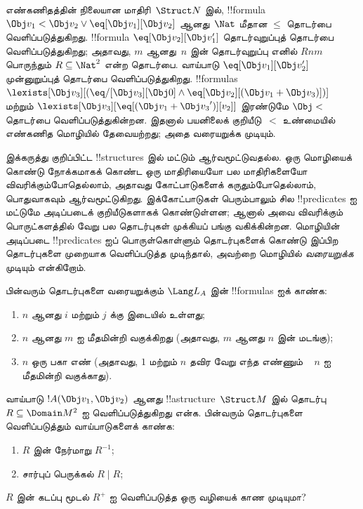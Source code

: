 \documentclass[../../../include/open-logic-section]{subfiles}
\begin{document}
\begin{ex}
எண்கணிதத்தின் நிலையான மாதிரி~$\Struct N$ இல், !!{formula}
$\Obj v_1 < \Obj v_2 \lor \eq[\Obj v_1][\Obj v_2]$ ஆனது~$\Nat$ மீதான
$\le$ தொடர்பை வெளிப்படுத்துகிறது. !!{formula}
$\eq[\Obj v_2][\Obj v_1']$ தொடர்வுறுப்புத் தொடர்பை வெளிப்படுத்துகிறது;
அதாவது, $m$ ஆனது~$n$ இன் தொடர்வுறுப்பு எனில் $Rnm$ பொருந்தும்
$R \subseteq \Nat^2$ என்ற தொடர்பை. வாய்பாடு
$\eq[\Obj v_1][\Obj v_2']$ முன்னுறுப்புத் தொடர்பை வெளிப்படுத்துகிறது.
!!{formula}s $\lexists[\Obj v_3][(\eq/[\Obj v_3][\Obj 0] \land
  \eq[\Obj v_2][(\Obj v_1 + \Obj v_3)])]$ மற்றும் $\lexists[\Obj
  v_3][\eq[(\Obj v_1 + {\Obj v_3}')][v_2]]$ இரண்டுமே $\Obj <$
தொடர்பை வெளிப்படுத்துகின்றன. இதனால் பயனிலைக் குறியீடு~$<$ உண்மையில்
எண்கணித மொழியில் தேவையற்றது; அதை வரையறுக்க முடியும்.
\end{ex}

\begin{explain}
இக்கருத்து குறிப்பிட்ட !!{structure}s இல் மட்டும் ஆர்வமூட்டுவதல்ல.
ஒரு மொழியைக் கொண்டு நோக்கமாகக் கொண்ட ஒரு மாதிரியையோ பல மாதிரிகளையோ
விவரிக்கும்போதெல்லாம், அதாவது கோட்பாடுகளைக் கருதும்போதெல்லாம், பொதுவாகவும்
ஆர்வமூட்டுகிறது. இக்கோட்பாடுகள் பெரும்பாலும் சில !!{predicate}s ஐ மட்டுமே
அடிப்படைக் குறியீடுகளாகக் கொண்டுள்ளன; ஆனால் அவை விவரிக்கும் பொருட்களத்தில்
வேறு பல தொடர்புகள் முக்கியப் பங்கு வகிக்கின்றன. மொழியின் அடிப்படை
!!{predicate}s ஐப் பொருள்கொள்ளும் தொடர்புகளைக் கொண்டு இப்பிற தொடர்புகளை
முறையாக வெளிப்படுத்த முடிந்தால், அவற்றை மொழியில் \emph{வரையறுக்க}
முடியும் என்கிறோம்.
\end{explain}

\begin{prob}
பின்வரும் தொடர்புகளை வரையறுக்கும் $\Lang L_A$ இன் !!{formula}s ஐக் காண்க:
\begin{enumerate}
\item $n$ ஆனது $i$ மற்றும் $j$ க்கு இடையில் உள்ளது;
\item $n$ ஆனது $m$ ஐ மீதமின்றி வகுக்கிறது (அதாவது, $m$ ஆனது $n$ இன்
  மடங்கு);
\item $n$ ஒரு பகா எண் (அதாவது, $1$ மற்றும் $n$ தவிர வேறு எந்த எண்ணும்
  ~ $n$ ஐ மீதமின்றி வகுக்காது).
\end{enumerate}
\end{prob}

\begin{prob}
வாய்பாடு $!A(\Obj v_1, \Obj v_2)$ ஆனது !!a{structure}~$\Struct M$
இல் தொடர்பு $R \subseteq \Domain M^2$ ஐ வெளிப்படுத்துகிறது என்க.
பின்வரும் தொடர்புகளை வெளிப்படுத்தும் வாய்பாடுகளைக் காண்க:
\begin{enumerate}
\item $R$ இன் நேர்மாறு $R^{-1}$;
\item சார்புப் பெருக்கல் $R \mid R$;
\end{enumerate}
$R$ இன் கடப்பு மூடல் $R^+$ ஐ வெளிப்படுத்த ஒரு வழியைக் காண முடியுமா?
\end{prob}
\end{document}
